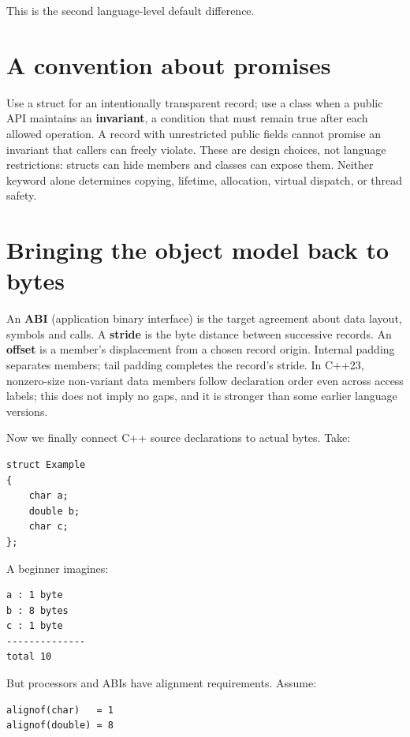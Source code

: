 This is the second language-level default difference.

\section{A convention about promises}\label{05-engine-i-ch003-a-convention-about-promises}

Use a struct for an intentionally transparent record; use a class when a public API maintains an \textbf{invariant}, a condition that must remain true after each allowed operation. A record with unrestricted public fields cannot promise an invariant that callers can freely violate. These are design choices, not language restrictions: structs can hide members and classes can expose them. Neither keyword alone determines copying, lifetime, allocation, virtual dispatch, or thread safety.

\section{Bringing the object model back to bytes}\label{05-engine-i-ch003-bringing-the-object-model-back-to-bytes}

An \textbf{ABI} (application binary interface) is the target agreement about data layout, symbols and calls. A \textbf{stride} is the byte distance between successive records. An \textbf{offset} is a member's displacement from a chosen record origin. Internal padding separates members; tail padding completes the record's stride. In C++23, nonzero-size non-variant data members follow declaration order even across access labels; this does not imply no gaps, and it is stronger than some earlier language versions.

Now we finally connect C++ source declarations to actual bytes. Take:

\begin{verbatim}
struct Example
{
    char a;
    double b;
    char c;
};
\end{verbatim}

A beginner imagines:

\begin{verbatim}
a : 1 byte
b : 8 bytes
c : 1 byte
--------------
total 10
\end{verbatim}

But processors and ABIs have alignment requirements. Assume:

\begin{verbatim}
alignof(char)   = 1
alignof(double) = 8
\end{verbatim}


